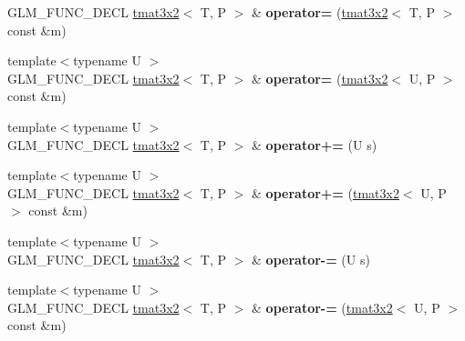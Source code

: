 \begin{DoxyCompactItemize}
\item 
G\+L\+M\+\_\+\+F\+U\+N\+C\+\_\+\+D\+E\+CL \hyperlink{structglm_1_1detail_1_1tmat3x2}{tmat3x2}$<$ T, P $>$ \& {\bfseries operator=} (\hyperlink{structglm_1_1detail_1_1tmat3x2}{tmat3x2}$<$ T, P $>$ const \&m)\hypertarget{structglm_1_1detail_1_1tmat3x2_abba3dc67eea8c0f2ceeea5a66b892644}{}\label{structglm_1_1detail_1_1tmat3x2_abba3dc67eea8c0f2ceeea5a66b892644}

\item 
{\footnotesize template$<$typename U $>$ }\\G\+L\+M\+\_\+\+F\+U\+N\+C\+\_\+\+D\+E\+CL \hyperlink{structglm_1_1detail_1_1tmat3x2}{tmat3x2}$<$ T, P $>$ \& {\bfseries operator=} (\hyperlink{structglm_1_1detail_1_1tmat3x2}{tmat3x2}$<$ U, P $>$ const \&m)\hypertarget{structglm_1_1detail_1_1tmat3x2_a14a1f4a49d2a1a04fa45935a33c47c3a}{}\label{structglm_1_1detail_1_1tmat3x2_a14a1f4a49d2a1a04fa45935a33c47c3a}

\item 
{\footnotesize template$<$typename U $>$ }\\G\+L\+M\+\_\+\+F\+U\+N\+C\+\_\+\+D\+E\+CL \hyperlink{structglm_1_1detail_1_1tmat3x2}{tmat3x2}$<$ T, P $>$ \& {\bfseries operator+=} (U s)\hypertarget{structglm_1_1detail_1_1tmat3x2_a41d01c7fbc6061206a33b265ddb9649b}{}\label{structglm_1_1detail_1_1tmat3x2_a41d01c7fbc6061206a33b265ddb9649b}

\item 
{\footnotesize template$<$typename U $>$ }\\G\+L\+M\+\_\+\+F\+U\+N\+C\+\_\+\+D\+E\+CL \hyperlink{structglm_1_1detail_1_1tmat3x2}{tmat3x2}$<$ T, P $>$ \& {\bfseries operator+=} (\hyperlink{structglm_1_1detail_1_1tmat3x2}{tmat3x2}$<$ U, P $>$ const \&m)\hypertarget{structglm_1_1detail_1_1tmat3x2_a0ce859a11cdafb33342c159b4a4f145a}{}\label{structglm_1_1detail_1_1tmat3x2_a0ce859a11cdafb33342c159b4a4f145a}

\item 
{\footnotesize template$<$typename U $>$ }\\G\+L\+M\+\_\+\+F\+U\+N\+C\+\_\+\+D\+E\+CL \hyperlink{structglm_1_1detail_1_1tmat3x2}{tmat3x2}$<$ T, P $>$ \& {\bfseries operator-\/=} (U s)\hypertarget{structglm_1_1detail_1_1tmat3x2_a5ee8c2917c7b4e74c626af4cf49fce63}{}\label{structglm_1_1detail_1_1tmat3x2_a5ee8c2917c7b4e74c626af4cf49fce63}

\item 
{\footnotesize template$<$typename U $>$ }\\G\+L\+M\+\_\+\+F\+U\+N\+C\+\_\+\+D\+E\+CL \hyperlink{structglm_1_1detail_1_1tmat3x2}{tmat3x2}$<$ T, P $>$ \& {\bfseries operator-\/=} (\hyperlink{structglm_1_1detail_1_1tmat3x2}{tmat3x2}$<$ U, P $>$ const \&m)\hypertarget{structglm_1_1detail_1_1tmat3x2_a8c12556de23e4325c229e14f6c93888c}{}\label{structglm_1_1detail_1_1tmat3x2_a8c12556de23e4325c229e14f6c93888c}


\end{DoxyCompactItemize}
